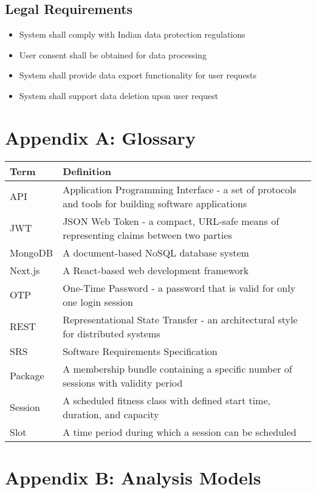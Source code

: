 \documentclass[12pt,a4paper]{article}
\begin{document}
\subsection{Legal Requirements}
\begin{itemize}
    \item System shall comply with Indian data protection regulations
    \item User consent shall be obtained for data processing
    \item System shall provide data export functionality for user requests
    \item System shall support data deletion upon user request
\end{itemize}

\section*{Appendix A: Glossary}

\begin{longtable}{|p{3cm}|p{10cm}|}
\hline
\textbf{Term} & \textbf{Definition} \\
\hline
API & Application Programming Interface - a set of protocols and tools for building software applications \\
\hline
JWT & JSON Web Token - a compact, URL-safe means of representing claims between two parties \\
\hline
MongoDB & A document-based NoSQL database system \\
\hline
Next.js & A React-based web development framework \\
\hline
OTP & One-Time Password - a password that is valid for only one login session \\
\hline
REST & Representational State Transfer - an architectural style for distributed systems \\
\hline
SRS & Software Requirements Specification \\
\hline
Package & A membership bundle containing a specific number of sessions with validity period \\
\hline
Session & A scheduled fitness class with defined start time, duration, and capacity \\
\hline
Slot & A time period during which a session can be scheduled \\
\hline
\end{longtable}

\section*{Appendix B: Analysis Models}
\end{document}
